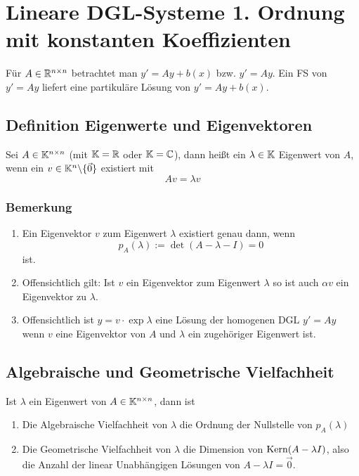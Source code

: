 \section{Lineare DGL-Systeme 1. Ordnung mit konstanten Koeffizienten}
Für $A \in \mathbb{R}^{n \times n}$ betrachtet man $y' = A y + b(x)$
bzw. $y' = A y$. Ein FS von $y' = A y$ liefert eine partikuläre Lösung von
$y' = A y + b(x)$.

\subsection{Definition Eigenwerte und Eigenvektoren}
Sei $A \in \mathbb{K}^{n\times n}$ (mit $\mathbb{K} = \mathbb{R}$ oder $\mathbb{K} = \mathbb{C}$), dann heißt ein $\lambda \in \mathbb{K}$
Eigenwert von $A$, wenn ein $v \in \mathbb{K}^n\backslash\{\vec{0}\}$ existiert mit
\begin{equation*}
	A v = \lambda v
\end{equation*}

\subsubsection{Bemerkung}
\begin{enumerate}[label= (\alph*)]
	\item Ein Eigenvektor $v$ zum Eigenwert $\lambda$ existiert genau dann, wenn
		\begin{equation*}
			p_A(\lambda) := \det(A - \lambda - I) = 0
		\end{equation*}
		ist.
	\item Offensichtlich gilt: Ist $v$ ein Eigenvektor zum Eigenwert $\lambda$ so ist auch 
		$\alpha v$ ein Eigenvektor zu $\lambda$.
	\item Offensichtlich ist $y = v \cdot \exp{\lambda}$ eine Lösung der homogenen DGL $y' = A y$
		wenn $v$ eine Eigenvektor von $A$ und $\lambda$ ein zugehöriger Eigenwert ist.
\end{enumerate}

\subsection{Algebraische und Geometrische Vielfachheit}
Ist $\lambda$ ein Eigenwert von $A \in \mathbb{K}^{n \times n}$, dann ist
\begin{enumerate}[label= (\alph*)]
	\item Die Algebraische Vielfachheit von $\lambda$ die Ordnung der Nullstelle von $p_A(\lambda)$
	\item Die Geometrische Vielfachheit von $\lambda$ die Dimension von $\operatorname{Kern}(A-\lambda I)$, also die
		Anzahl der linear Unabhängigen Lösungen von $A - \lambda I = \vec{0}$.
\end{enumerate}

